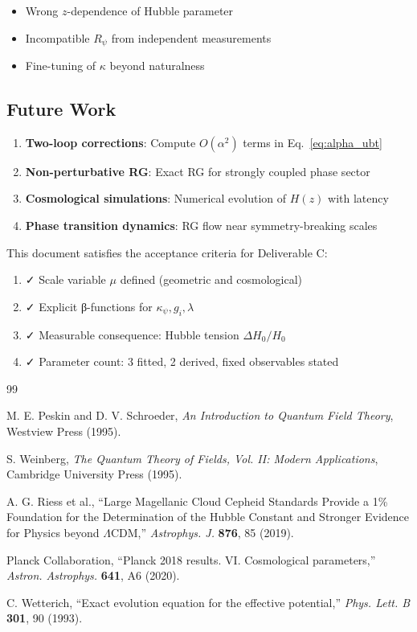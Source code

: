 \documentclass[12pt]{article}
\begin{document}
\begin{itemize}
    \item Wrong $z$-dependence of Hubble parameter
    \item Incompatible $R_\psi$ from independent measurements
    \item Fine-tuning of $\kappa$ beyond naturalness
\end{itemize}

\subsection{Future Work}

\begin{enumerate}
    \item \textbf{Two-loop corrections}: Compute $O(\alpha^2)$ terms in Eq.~\eqref{eq:alpha_ubt}
    \item \textbf{Non-perturbative RG}: Exact RG for strongly coupled phase sector
    \item \textbf{Cosmological simulations}: Numerical evolution of $H(z)$ with latency
    \item \textbf{Phase transition dynamics}: RG flow near symmetry-breaking scales
\end{enumerate}

This document satisfies the acceptance criteria for Deliverable C:
\begin{enumerate}
    \item ✓ Scale variable $\mu$ defined (geometric and cosmological)
    \item ✓ Explicit β-functions for $\kappa_\psi, g_i, \lambda$
    \item ✓ Measurable consequence: Hubble tension $\Delta H_0/H_0$
    \item ✓ Parameter count: 3 fitted, 2 derived, fixed observables stated
\end{enumerate}


\begin{thebibliography}{99}

M. E. Peskin and D. V. Schroeder, \textit{An Introduction to Quantum Field Theory}, Westview Press (1995).

S. Weinberg, \textit{The Quantum Theory of Fields, Vol. II: Modern Applications}, Cambridge University Press (1995).

A. G. Riess et al., ``Large Magellanic Cloud Cepheid Standards Provide a 1\% Foundation for the Determination of the Hubble Constant and Stronger Evidence for Physics beyond $\Lambda$CDM,'' \textit{Astrophys. J.} \textbf{876}, 85 (2019).

Planck Collaboration, ``Planck 2018 results. VI. Cosmological parameters,'' \textit{Astron. Astrophys.} \textbf{641}, A6 (2020).

C. Wetterich, ``Exact evolution equation for the effective potential,'' \textit{Phys. Lett. B} \textbf{301}, 90 (1993).

\end{thebibliography}
\end{document}
